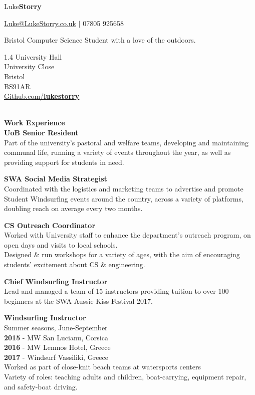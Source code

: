 \documentclass[10pt]{article}
\newcommand{\sect}[1]{{\LARGE{\textbf{#1}}}\vspace{0.1em}\\}
\newcommand{\xx}[2]{{\large\textbf{#1}}\\{#2}\vspace{0.5em}}
\begin{document}
\begin{center}
{\Huge{{Luke}\textbf{Storry}}}
\hspace{0.1em}

{\large \href{mailto:Luke@LukeStorry.co.uk}{Luke@LukeStorry.co.uk}  $|$  07805 925658} 
\hspace{0.1em}

Bristol Computer Science Student with a love of the outdoors.\\
{\textcolor{linecol}\hrulefill}
\end{center}
%
%
%
%
%
%
\begin{minipage}[t]{0.33\textwidth} %
1.4 University Hall\\University Close\\Bristol\\BS91AR
\vspace{0.5em}\\
\href{https://github.com/lukestorry}{Github.com/\textbf{lukestorry}} \\
\\
\raggedright
\sect{Work Experience}
\xx{UoB Senior Resident}
{Part of the university's pastoral and welfare teams, developing and maintaining communal life, running a variety of events throughout the year, as well as providing support for students in need.}

\xx{SWA Social Media Strategist}
{Coordinated with the logistics and marketing teams to advertise and promote Student Windsurfing events around the country, across a variety of platforms, doubling reach on average every two months.}

\xx{CS Outreach Coordinator}{Worked with University staff to enhance the department's outreach program, on open days and visits to local schools. \\
Designed \& run workshops for a variety of ages, with the aim of encouraging students' excitement about CS \& engineering.}

\xx{Chief Windsurfing Instructor}
{Lead and managed a team of 15 instructors providing tuition to over 100 beginners at the SWA Aussie Kiss Festival 2017.}

\xx{Windsurfing Instructor}
{Summer seasons, June-September\\
\textbf{2015} - MW San Lucianu, Corsica\\
\textbf{2016} - MW Lemnos Hotel, Greece\\
\textbf{2017} - Windsurf Vassiliki, Greece\\
Worked as part of close-knit beach teams at watersports centers\\
Variety of roles: teaching adults and children, boat-carrying, equipment repair, and safety-boat driving.}



\end{minipage}
\end{document}
